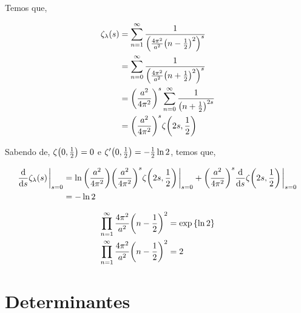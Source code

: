 \documentclass[twoside]{amsart}
\numberwithin{equation}{section}
\begin{document}
Temos que,

\begin{align}
    \zeta_\lambda\qty(s)&=\sum\limits_{n=1}^\infty\frac{1}{\qty(\frac{4\pi^2}{a^2}\qty(n-\frac12)^2)^s}\\
    &=\sum\limits_{n=0}^\infty\frac{1}{\qty(\frac{4\pi^2}{a^2}\qty(n+\frac12)^2)^s}\\
    &=\qty(\frac{a^2}{4\pi^2})^s\sum\limits_{n=0}^\infty\frac{1}{\qty(n+\frac12)^{2s}}\\
    &=\qty(\frac{a^2}{4\pi^2})^s\zeta\qty(2s,\frac12)
\end{align}

Sabendo de, $\zeta\qty(0,\frac12)=0$ e $\zeta'\qty(0,\frac12)=-\frac12\ln2$, temos que,

\begin{align}
    \dv{}{s}\zeta_\lambda\qty(s)\eval_{s=0}&=\ln\qty(\frac{a^2}{4\pi^2})\qty(\frac{a^2}{4\pi^2})^s\zeta\qty(2s,\frac12)\eval_{s=0}+\qty(\frac{a^2}{4\pi^2})^s\dv{}{s}\zeta\qty(2s,\frac12)\eval_{s=0}\\
    &=-\ln2
\end{align}

\begin{align}
    \prod\limits_{n=1}^{\infty}\frac{4\pi^2}{a^2}\qty(n-\frac12)^2&=\exp\qty{\ln 2}\\
    \prod\limits_{n=1}^{\infty}\frac{4\pi^2}{a^2}\qty(n-\frac12)^2&=2
\end{align}



\section{Determinantes}



\end{document}

